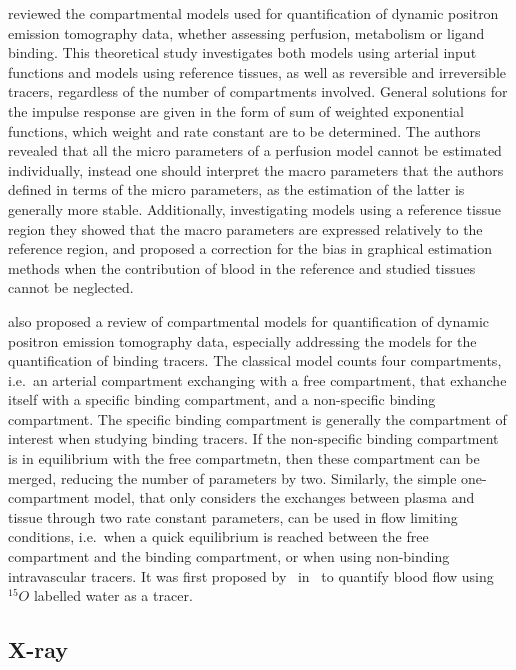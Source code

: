 \citet{Gunn:2001cx} reviewed the compartmental models used for quantification of dynamic positron emission tomography data, whether assessing perfusion, metabolism or ligand binding.
This theoretical study investigates both models using arterial input functions and models using reference tissues, as well as reversible and irreversible tracers, regardless of the number of compartments involved. 
General solutions for the impulse response are given in the form of sum of weighted exponential functions, which weight and rate constant are to be determined.
The authors revealed that all the micro parameters of a perfusion model cannot be estimated individually, instead one should interpret the macro parameters that the authors defined in terms of the micro parameters, as the estimation of the latter is generally more stable.
Additionally, investigating models using a reference tissue region they showed that the macro parameters are expressed relatively to the reference region, and proposed a correction for the bias in graphical estimation methods when the contribution of blood in the reference and studied tissues cannot be neglected.

\citet{Watabe:2006uy} also proposed a review of compartmental models for quantification of dynamic positron emission tomography data, especially addressing the models for the quantification of binding tracers.
The classical model counts four compartments, i.e.~an arterial compartment exchanging with a free compartment, that exhanche itself with a specific binding compartment, and a non-specific binding compartment.
The specific binding compartment is generally the compartment of interest when studying binding tracers.
If the non-specific binding compartment is in equilibrium with the free compartmetn, then these compartment can be merged, reducing the number of parameters by two.
Similarly, the simple one-compartment model, that only considers the exchanges between plasma and tissue through two rate constant parameters, can be used in flow limiting conditions, i.e.~when a quick equilibrium is reached between the free compartment and the binding compartment, or when using non-binding intravascular tracers.
It was first proposed by~\citet{Kety:1948je} in~\citeyear{Kety:1948je} to quantify blood flow using $^{15}O$ labelled water as a tracer.

\subsection{X-ray}

